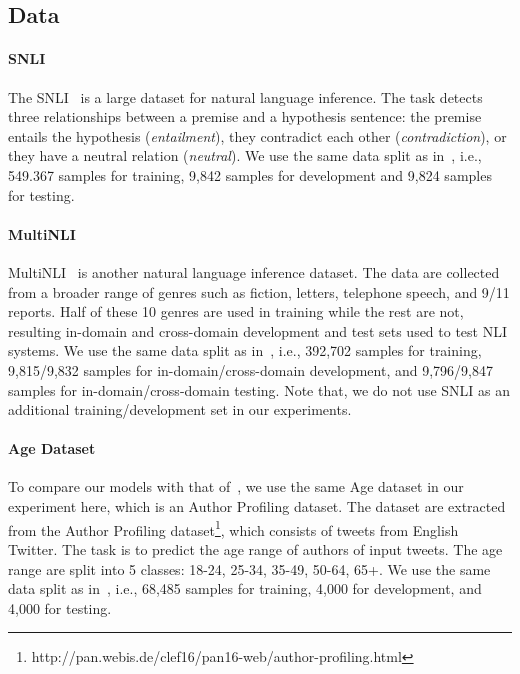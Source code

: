 \documentclass[11pt]{article}
\begin{document}
\subsection{Data}
\paragraph{SNLI} The SNLI~\cite{DBLP:conf/emnlp/BowmanAPM15} is a large dataset for natural language inference. The task detects three relationships between a premise and a hypothesis sentence: the premise entails the hypothesis (\textit{entailment}), they contradict each other (\textit{contradiction}), or they have a neutral relation (\textit{neutral}). We use the same data split as in~, i.e., 549.367 samples for training, 9,842 samples for development and 9,824 samples for testing. 

\paragraph{MultiNLI} MultiNLI~\cite{DBLP:journals/corr/WilliamsNB17} is another natural language inference dataset. The data are collected from a broader range of genres such as fiction, letters, telephone speech, and 9/11 reports. Half of these 10 genres are used in training while the rest are not, resulting in-domain and cross-domain development and test sets used to test NLI systems. We use the same data split as in~, i.e., 392,702 samples for training, 9,815/9,832 samples for in-domain/cross-domain development, and 9,796/9,847 samples for in-domain/cross-domain testing. Note that, we do not use SNLI as an additional training/development set in our experiments.

\paragraph{Age Dataset} To compare our models with that of~, we use the same Age dataset in our experiment here, which is an Author Profiling dataset. The dataset are extracted from the Author Profiling dataset\footnote{http://pan.webis.de/clef16/pan16-web/author-profiling.html}, which consists of tweets from English Twitter. The task is to predict the age range of authors of input tweets. The age range are split into 5 classes: 18-24, 25-34, 35-49, 50-64, 65+. We use the same data split as in~, i.e., 68,485 samples for training, 4,000 for development, and 4,000 for testing. 
\end{document}
